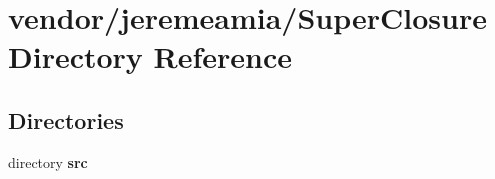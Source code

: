 \section{vendor/jeremeamia/\+Super\+Closure Directory Reference}
\label{dir_073e55652ce1e8c1a858e63f8b529a3a}
\subsection*{Directories}
\begin{DoxyCompactItemize}
\item 
directory {\bf src}
\end{DoxyCompactItemize}
